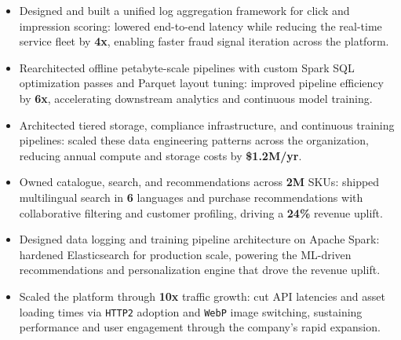 \documentclass[11pt,letterpaper,sans]{resume}
\begin{document}

\begin{itemize}
\item Designed and built a unified log aggregation framework for click and impression scoring: lowered end-to-end latency while reducing the real-time service fleet by \textbf{4x}, enabling faster fraud signal iteration across the platform.
\item Rearchitected offline petabyte-scale pipelines with custom Spark SQL optimization passes and Parquet layout tuning: improved pipeline efficiency by \textbf{6x}, accelerating downstream analytics and continuous model training.
\item Architected tiered storage, compliance infrastructure, and continuous training pipelines: scaled these data engineering patterns across the organization, reducing annual compute and storage costs by \textbf{\$1.2M/yr}.
\end{itemize}


\begin{itemize}
\item Owned catalogue, search, and recommendations across \textbf{2M} SKUs: shipped multilingual search in \textbf{6} languages and purchase recommendations with collaborative filtering and customer profiling, driving a \textbf{24\%} revenue uplift.
\item Designed data logging and training pipeline architecture on Apache Spark: hardened Elasticsearch for production scale, powering the ML-driven recommendations and personalization engine that drove the revenue uplift.
\item Scaled the platform through \textbf{10x} traffic growth: cut API latencies and asset loading times via \texttt{HTTP2} adoption and \texttt{WebP} image switching, sustaining performance and user engagement through the company's rapid expansion.
\end{itemize}

\end{document}
